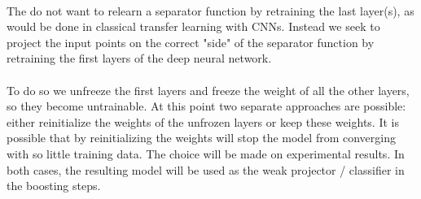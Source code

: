 \documentclass[11 pt]{article}
\begin{document}
\paragraph{}The do not want to relearn a separator function by retraining the last layer(s), as would be done in classical transfer learning with CNNs. Instead we seek to project the input points on the correct "side" of the separator function by retraining the first layers of the deep neural network.

\paragraph{} To do so we unfreeze the first layers and freeze the weight of all the other layers, so they become untrainable. At this point two separate approaches are possible: either reinitialize the weights of the unfrozen layers or keep these weights. It is possible that by reinitializing the weights will stop the model from converging with so little training data. The choice will be made on experimental results. In both cases, the resulting model will be used as the weak projector / classifier in the boosting steps. \\
\end{document}

